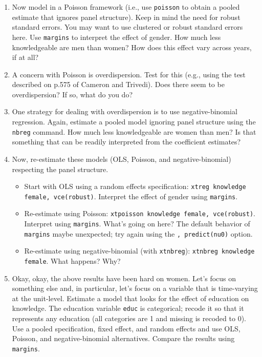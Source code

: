 \documentclass[a4paper,12pt]{article}
\begin{document}
\begin{enumerate}
\item Now model in a Poisson framework (i.e., use \texttt{poisson} to obtain a pooled estimate that ignores panel structure). Keep in mind the need for robust standard errors. You may want to use clustered or robust standard errors here. Use \texttt{margins} to interpret the effect of gender. How much less knowledgeable are men than women? How does this effect vary across years, if at all?

\item A concern with Poisson is overdispersion. Test for this (e.g., using the test described on p.575 of Cameron and Trivedi). Does there seem to be overdispersion? If so, what do you do?

\item One strategy for dealing with overdispersion is to use negative-binomial regression. Again, estimate a pooled model ignoring panel structure using the \texttt{nbreg} command. How much less knowledgeable are women than men? Is that something that can be readily interpreted from the coefficient estimates?

\item Now, re-estimate these models (OLS, Poisson, and negative-binomial) respecting the panel structure. 

    \begin{itemize}
    \item Start with OLS using a random effects specification: \texttt{xtreg knowledge female, vce(robust)}. Interpret the effect of gender using \texttt{margins}.
    
    \item Re-estimate using Poisson: \texttt{xtpoisson knowledge female, vce(robust)}. Interpret using \texttt{margins}. What's going on here? The default behavior of \texttt{margins} maybe unexpected; try again using the \texttt{, predict(nu0)} option.
    
    \item Re-estimate using negative-binomial (with \texttt{xtnbreg}): \texttt{xtnbreg knowledge female}. What happens? Why?
    \end{itemize}

\item Okay, okay, the above results have been hard on women. Let's focus on something else and, in particular, let's focus on a variable that is time-varying at the unit-level. Estimate a model that looks for the effect of education on knowledge. The education variable \texttt{educ} is categorical; recode it so that it represents any education (all categories are 1 and missing is recoded to 0). Use a pooled specification, fixed effect, and random effects and use OLS, Poisson, and negative-binomial alternatives. Compare the results using \texttt{margins}.

\end{enumerate}
\end{document}
